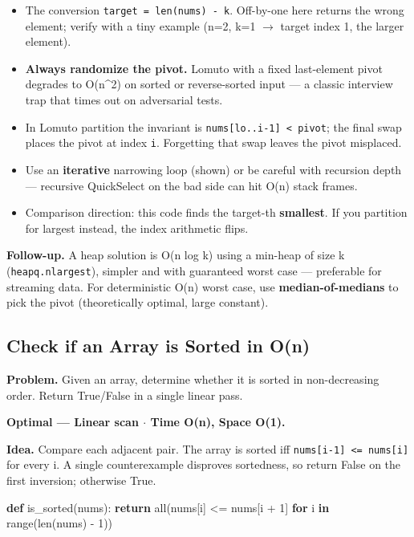 \documentclass[11pt]{article}
\providecommand{\tightlist}{\setlength{\itemsep}{1pt}\setlength{\parskip}{0pt}}
\newenvironment{Shaded}{\begin{snugshade}}{\end{snugshade}}
\newcommand{\BuiltInTok}[1]{\textcolor[rgb]{0.50,0.55,0.55}{#1}}
\newcommand{\ControlFlowTok}[1]{\textcolor[rgb]{0.99,0.74,0.29}{\textbf{#1}}}
\newcommand{\DecValTok}[1]{\textcolor[rgb]{0.96,0.45,0.00}{#1}}
\newcommand{\KeywordTok}[1]{\textcolor[rgb]{0.81,0.81,0.76}{\textbf{#1}}}
\newcommand{\NormalTok}[1]{\textcolor[rgb]{0.81,0.81,0.76}{#1}}
\newcommand{\OperatorTok}[1]{\textcolor[rgb]{0.81,0.81,0.76}{#1}}
\begin{document}
\begin{itemize}
\tightlist
\item
  The conversion \texttt{target\ =\ len(nums)\ -\ k}. Off-by-one here returns the wrong element; verify with a tiny example (n=2, k=1 \(\rightarrow\) target index 1, the larger element).
\item
  \textbf{Always randomize the pivot.} Lomuto with a fixed last-element pivot degrades to O(n\^{}2) on sorted or reverse-sorted input --- a classic interview trap that times out on adversarial tests.
\item
  In Lomuto partition the invariant is \texttt{nums{[}lo..i-1{]}\ \textless{}\ pivot}; the final swap places the pivot at index \texttt{i}. Forgetting that swap leaves the pivot misplaced.
\item
  Use an \textbf{iterative} narrowing loop (shown) or be careful with recursion depth --- recursive QuickSelect on the bad side can hit O(n) stack frames.
\item
  Comparison direction: this code finds the target-th \textbf{smallest}. If you partition for largest instead, the index arithmetic flips.
\end{itemize}

\textbf{Follow-up.} A heap solution is O(n log k) using a min-heap of size k (\texttt{heapq.nlargest}), simpler and with guaranteed worst case --- preferable for streaming data. For deterministic O(n) worst case, use \textbf{median-of-medians} to pick the pivot (theoretically optimal, large constant).

\subsection{Check if an Array is Sorted in O(n)}\label{check-if-an-array-is-sorted-in-on}

\textbf{Problem.} Given an array, determine whether it is sorted in non-decreasing order. Return True/False in a single linear pass.

\textbf{Optimal --- Linear scan \(\cdot\) Time O(n), Space O(1).}

\textbf{Idea.} Compare each adjacent pair. The array is sorted iff \texttt{nums{[}i-1{]}\ \textless{}=\ nums{[}i{]}} for every i. A single counterexample disproves sortedness, so return False on the first inversion; otherwise True.


\begin{Shaded}
\begin{Highlighting}[]
\KeywordTok{def}\NormalTok{ is\_sorted(nums):}
    \ControlFlowTok{return} \BuiltInTok{all}\NormalTok{(nums[i] }\OperatorTok{\textless{}=}\NormalTok{ nums[i }\OperatorTok{+} \DecValTok{1}\NormalTok{] }\ControlFlowTok{for}\NormalTok{ i }\KeywordTok{in} \BuiltInTok{range}\NormalTok{(}\BuiltInTok{len}\NormalTok{(nums) }\OperatorTok{{-}} \DecValTok{1}\NormalTok{))}
\end{Highlighting}
\end{Shaded}
\end{document}
